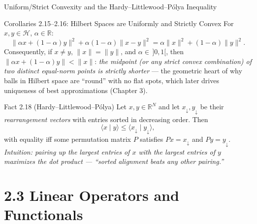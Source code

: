 \documentclass[aspectratio=169,10pt]{beamer}
\newcommand{\R}{\mathbb{R}}
\newcommand{\Hil}{\mathcal{H}}
\newcommand{\ip}[2]{\langle #1 \mid #2 \rangle}
\begin{document}
\begin{frame}{Uniform/Strict Convexity and the Hardy--Littlewood--P\'olya Inequality}
  \begin{block}{Corollaries 2.15--2.16: Hilbert Spaces are Uniformly and Strictly Convex}
    For $x,y\in\Hil$, $\alpha\in\R$:
    \[
      \|\alpha x+(1-\alpha)y\|^2+\alpha(1-\alpha)\|x-y\|^2 =
      \alpha\|x\|^2+(1-\alpha)\|y\|^2.
    \]
    Consequently, if $x\ne y$, $\|x\|=\|y\|$, and $\alpha\in\,]0,1[$, then
    $\|\alpha x+(1-\alpha)y\| < \|x\|$: \emph{the midpoint (or any strict
    convex combination) of two distinct equal-norm points is strictly
    shorter} --- the geometric heart of why balls in Hilbert space are
    ``round'' with no flat spots, which later drives uniqueness of best
    approximations (Chapter 3).
  \end{block}

  \begin{block}{Fact 2.18 (Hardy--Littlewood--P\'olya)}
    Let $x,y\in\R^N$ and let $x_\downarrow, y_\downarrow$ be their
    \emph{rearrangement vectors} with entries sorted in decreasing order.
    Then
    \[
      \ip{x}{y} \le \ip{x_\downarrow}{y_\downarrow},
    \]
    with equality iff some permutation matrix $P$ satisfies $Px=x_\downarrow$
    and $Py=y_\downarrow$. \textit{Intuition: pairing up the largest entries
    of $x$ with the largest entries of $y$ maximizes the dot product ---
    ``sorted alignment beats any other pairing.''}
  \end{block}
\end{frame}

\section{2.3 Linear Operators and Functionals}
\end{document}
